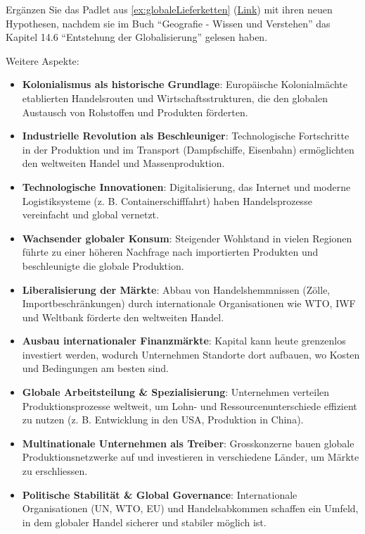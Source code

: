 \begin{myexercise}
Ergänzen Sie das Padlet aus \cref{ex:globaleLieferketten} (\href{https://padlet.com/serafinschneider/ursachen-globalisierung-n4umvx8vos79ow8i}{Link}) mit ihren neuen Hypothesen, nachdem sie im Buch \enquote{Geografie - Wissen und Verstehen} \cite{hep} das Kapitel 14.6 \enquote{Entstehung der Globalisierung} gelesen haben.
\begin{myanswer}
Weitere Aspekte:

\begin{itemize}
\item \textbf{Kolonialismus als historische Grundlage}: Europäische Kolonialmächte etablierten Handelsrouten und Wirtschaftsstrukturen, die den globalen Austausch von Rohstoffen und Produkten förderten.
\item \textbf{Industrielle Revolution als Beschleuniger}: Technologische Fortschritte in der Produktion und im Transport (Dampfschiffe, Eisenbahn) ermöglichten den weltweiten Handel und Massenproduktion.
\item \textbf{Technologische Innovationen}: Digitalisierung, das Internet und moderne Logistiksysteme (z. B. Containerschifffahrt) haben Handelsprozesse vereinfacht und global vernetzt.
\item \textbf{Wachsender globaler Konsum}: Steigender Wohlstand in vielen Regionen führte zu einer höheren Nachfrage nach importierten Produkten und beschleunigte die globale Produktion.
\item \textbf{Liberalisierung der Märkte}: Abbau von Handelshemmnissen (Zölle, Importbeschränkungen) durch internationale Organisationen wie \gls{WTO}, \gls{IWF} und Weltbank förderte den weltweiten Handel.
\item \textbf{Ausbau internationaler Finanzmärkte}: Kapital kann heute grenzenlos investiert werden, wodurch Unternehmen Standorte dort aufbauen, wo Kosten und Bedingungen am besten sind.
\item \textbf{Globale Arbeitsteilung \& Spezialisierung}: Unternehmen verteilen Produktionsprozesse weltweit, um Lohn- und Ressourcenunterschiede effizient zu nutzen (z. B. Entwicklung in den USA, Produktion in China).
\item \textbf{Multinationale Unternehmen als Treiber}: Grosskonzerne bauen globale Produktionsnetzwerke auf und investieren in verschiedene Länder, um Märkte zu erschliessen.
\item \textbf{Politische Stabilität \& Global Governance}:
Internationale Organisationen (\gls{UN}, \gls{WTO}, \gls{EU}) und Handelsabkommen schaffen ein Umfeld, in dem globaler Handel sicherer und stabiler möglich ist.
\end{itemize}

\end{myanswer}
\end{myexercise}

